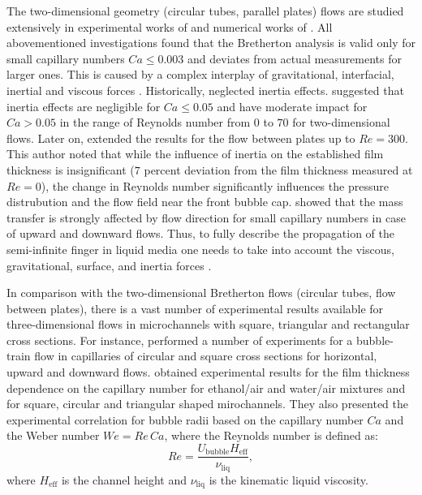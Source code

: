 \documentclass[preprint,12pt]{elsarticle}
\begin{document}
The two-dimensional geometry (circular tubes, parallel plates) flows are studied extensively in
experimental works of \citet{aussillous-deposition, cerro-bubble-train} and numerical works of
\citet{giavedoni-numerical,heil-bretherton}. All abovementioned investigations found that the 
Bretherton
analysis is valid only for small capillary numbers $Ca\leq 0.003$ and deviates from actual
measurements for larger ones.
This is caused by a complex interplay of gravitational,
interfacial, inertial and viscous forces \cite{gupta-review}. Historically, 
\citet{bretherton} neglected inertia effects. \citet{giavedoni-numerical} suggested
that
inertia effects
are negligible for $Ca \leq 0.05$ and have moderate impact for $Ca>0.05$ in the range of Reynolds
number from $0$ to $70$ for two-dimensional flows. Later on, \citet{heil-bretherton}
extended
the results for the flow between plates up to $Re=300$. This author noted that while the
influence of inertia on the established film thickness is
insignificant
($7$ percent deviation from the film thickness measured at $Re=0$), the change in Reynolds number
significantly influences  the pressure distrubution and the flow field near the front bubble cap.
\citet{cerro-bubble-train} showed that the mass transfer is strongly affected by flow direction for
small capillary numbers in case of upward and downward flows. Thus, to fully describe the
propagation of the semi-infinite finger in liquid media one needs to take into account the
viscous, gravitational, surface, and inertia forces \cite{gupta-review}.  

In comparison with the two-dimensional Bretherton flows (circular tubes, flow between plates), there
is a vast number of experimental
results available for three-dimensional flows in microchannels with square, triangular and
rectangular cross sections. For instance, \citet{cerro-bubble-train} performed a number of
experiments for a
bubble-train flow in capillaries of
circular and square cross sections for horizontal, upward and downward flows.
\citet{shikazono-square} obtained
experimental
results for the film thickness dependence on the
capillary number for ethanol/air and water/air mixtures and for square, circular and triangular
shaped mirochannels. They also presented the experimental correlation for  bubble
radii
based on the capillary number $Ca$ and the Weber number $We=Re\,Ca$, where the Reynolds number is
defined as:
\begin{equation}
Re=\frac{U_{\mathrm{bubble}} H_{\mathrm{eff}}}{\nu_{\mathrm{liq}}},
\end{equation}
where $H_{\mathrm{eff}}$ is the channel height and $\nu_{\mathrm{liq}}$ is the kinematic liquid
viscosity.
\end{document}

